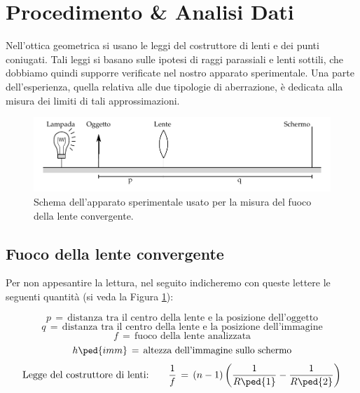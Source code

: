 \section{Procedimento \& Analisi Dati}

Nell'ottica geometrica si usano le leggi del costruttore di lenti e dei punti coniugati.
Tali leggi si basano sulle ipotesi di raggi parassiali e lenti sottili, che dobbiamo quindi supporre verificate
nel nostro apparato sperimentale. Una parte dell'esperienza, quella relativa alle due tipologie di aberrazione, è dedicata alla misura dei limiti di tali approssimazioni.

\begin{figure}[b!]
	\includegraphics[width=16cm]{drawing.pdf}
    \caption{Schema dell'apparato sperimentale usato per la misura del fuoco della lente convergente.}
    \label{fig:conv}
\end{figure}

\subsection{Fuoco della lente convergente}

Per non appesantire la lettura, nel seguito indicheremo con queste lettere le seguenti quantità (si veda la Figura \ref{fig:conv}):

\begin{equation*}
	p \,=\, \text{distanza tra il centro della lente e la posizione dell'oggetto}
\end{equation*}
\begin{equation*}
	q \,=\, \text{distanza tra il centro della lente e la posizione dell'immagine}
\end{equation*}
\begin{equation*}
	f \,=\, \text{fuoco della lente analizzata}
\end{equation*}
\begin{equation*}
	h \ped{imm} \,=\, \text{altezza dell'immagine sullo schermo}
\end{equation*}
\begin{equation}
	\text{Legge del costruttore di lenti:} \qquad \frac{1}{f} \,=\, (n-1)\left(\frac{1}{R\ped{1}}-\frac{1}{R\ped{2}}\right)
	\label{eq:costruttore}
\end{equation}


